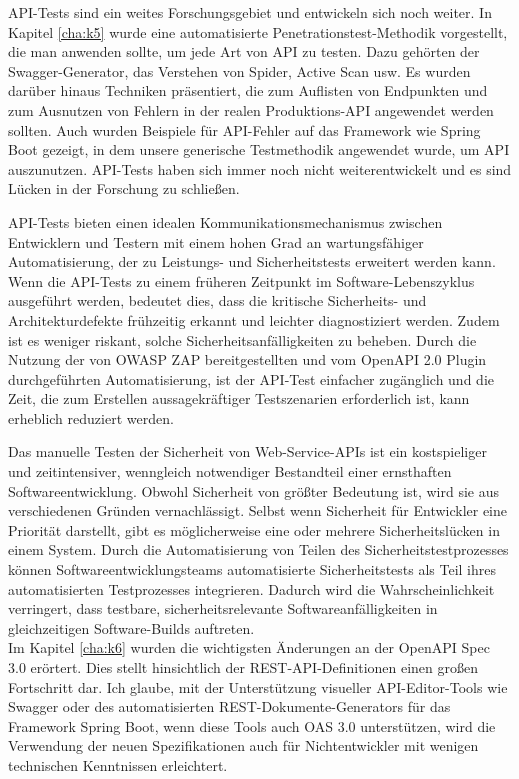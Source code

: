 API-Tests sind ein weites Forschungsgebiet und entwickeln sich noch weiter. In Kapitel \ref{cha:k5} wurde eine automatisierte Penetrationstest-Methodik vorgestellt, die man anwenden sollte, um jede Art von API zu testen. Dazu gehörten der Swagger-Generator, das Verstehen von Spider, Active Scan usw. Es wurden darüber hinaus Techniken präsentiert, die zum Auflisten von Endpunkten und zum Ausnutzen von Fehlern in der realen Produktions-API angewendet werden sollten. Auch wurden Beispiele für API-Fehler auf das Framework wie Spring Boot gezeigt, in dem unsere generische Testmethodik angewendet wurde, um API auszunutzen. API-Tests haben sich immer noch nicht weiterentwickelt und es sind Lücken in der Forschung zu schließen.

API-Tests bieten einen idealen Kommunikationsmechanismus zwischen Entwicklern und Testern mit einem hohen Grad an wartungsfähiger Automatisierung, der zu Leistungs- und Sicherheitstests erweitert werden kann. Wenn die API-Tests zu einem früheren Zeitpunkt im Software-Lebenszyklus ausgeführt werden, bedeutet dies, dass die kritische Sicherheits- und Architekturdefekte frühzeitig erkannt und leichter diagnostiziert werden. Zudem ist es weniger riskant, solche Sicherheitsanfälligkeiten zu beheben. Durch die Nutzung der von OWASP ZAP bereitgestellten und vom OpenAPI 2.0 Plugin durchgeführten Automatisierung, ist der API-Test einfacher zugänglich und die Zeit, die zum Erstellen aussagekräftiger Testszenarien erforderlich ist, kann erheblich reduziert werden.

Das manuelle Testen der Sicherheit von Web-Service-APIs ist ein kostspieliger und zeitintensiver, wenngleich notwendiger Bestandteil einer ernsthaften Softwareentwicklung. Obwohl Sicherheit von größter Bedeutung ist, wird sie aus verschiedenen Gründen vernachlässigt. Selbst wenn Sicherheit für Entwickler eine Priorität darstellt, gibt es möglicherweise eine oder mehrere Sicherheitslücken in einem System. Durch die Automatisierung von Teilen des Sicherheitstestprozesses können Softwareentwicklungsteams automatisierte Sicherheitstests als Teil ihres automatisierten Testprozesses integrieren. Dadurch wird die Wahrscheinlichkeit verringert, dass testbare, sicherheitsrelevante Softwareanfälligkeiten in gleichzeitigen Software-Builds auftreten.\\


Im Kapitel \ref{cha:k6} wurden die wichtigsten Änderungen an der OpenAPI Spec 3.0 erörtert. Dies stellt hinsichtlich der REST-API-Definitionen einen großen Fortschritt dar. Ich glaube, mit der Unterstützung visueller API-Editor-Tools wie Swagger oder des automatisierten REST-Dokumente-Generators für das Framework Spring Boot, wenn diese Tools auch OAS 3.0 unterstützen, wird die Verwendung der neuen Spezifikationen auch für Nichtentwickler mit wenigen technischen Kenntnissen erleichtert.

